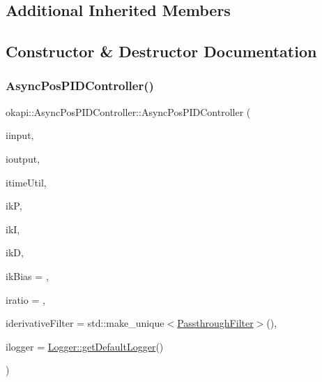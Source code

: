 \subsection*{Additional Inherited Members}


\subsection{Constructor \& Destructor Documentation}
\mbox{\label{classokapi_1_1AsyncPosPIDController_ad66e9890d43f60ed304a356b52baad80}} 
\subsubsection{\texorpdfstring{AsyncPosPIDController()}{AsyncPosPIDController()}\hspace{0.1cm}{\footnotesize\ttfamily [1/2]}}
{\footnotesize\ttfamily okapi\+::\+Async\+Pos\+P\+I\+D\+Controller\+::\+Async\+Pos\+P\+I\+D\+Controller (\begin{DoxyParamCaption}\item[{const std\+::shared\+\_\+ptr$<$ \mbox{\hyperlink{classokapi_1_1ControllerInput}{Controller\+Input}}$<$ double $>$$>$ \&}]{iinput,  }\item[{const std\+::shared\+\_\+ptr$<$ \mbox{\hyperlink{classokapi_1_1ControllerOutput}{Controller\+Output}}$<$ double $>$$>$ \&}]{ioutput,  }\item[{const \mbox{\hyperlink{classokapi_1_1TimeUtil}{Time\+Util}} \&}]{itime\+Util,  }\item[{double}]{ikP,  }\item[{double}]{ikI,  }\item[{double}]{ikD,  }\item[{double}]{ik\+Bias = {},  }\item[{double}]{iratio = {},  }\item[{std\+::unique\+\_\+ptr$<$ \mbox{\hyperlink{classokapi_1_1Filter}{Filter}} $>$}]{iderivative\+Filter = {\ttfamily std\+:\+:make\+\_\+unique$<$\mbox{\hyperlink{classokapi_1_1PassthroughFilter}{Passthrough\+Filter}}$>$()},  }\item[{const std\+::shared\+\_\+ptr$<$ \mbox{\hyperlink{classokapi_1_1Logger}{Logger}} $>$ \&}]{ilogger = {\ttfamily \mbox{\hyperlink{classokapi_1_1Logger_a5053cf778b4b55acba788a3797dc96d2}{Logger\+::get\+Default\+Logger}}()} }\end{DoxyParamCaption})}

